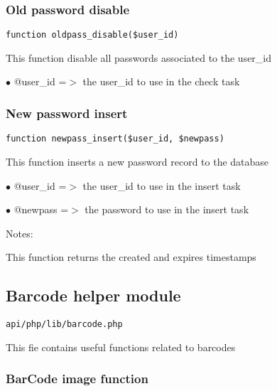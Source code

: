 \documentclass[a4paper]{article}
\begin{document}
\hypertarget{toc382}{}
\subsubsection{Old password disable}

\begin{lstlisting}
function oldpass_disable($user_id)
\end{lstlisting}

This function disable all passwords associated to the user\_id

\begin{compactitem}
\item[\color{myblue}$\bullet$] @user\_id =$>$ the user\_id to use in the check task
\end{compactitem}

\hypertarget{toc383}{}
\subsubsection{New password insert}

\begin{lstlisting}
function newpass_insert($user_id, $newpass)
\end{lstlisting}

This function inserts a new password record to the database

\begin{compactitem}
\item[\color{myblue}$\bullet$] @user\_id =$>$ the user\_id to use in the insert task
\item[\color{myblue}$\bullet$] @newpass =$>$ the password to use in the insert task
\end{compactitem}

Notes:

This function returns the created and expires timestamps

\hypertarget{toc384}{}
\subsection{Barcode helper module}

\begin{lstlisting}
api/php/lib/barcode.php
\end{lstlisting}

This fie contains useful functions related to barcodes

\hypertarget{toc385}{}
\subsubsection{BarCode image function}
\end{document}
